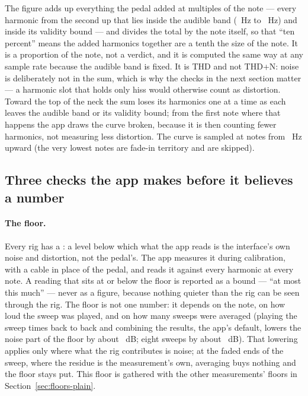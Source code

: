 \documentclass[11pt,a4paper]{article}
\begin{document}
The  figure adds up everything the pedal added at multiples of
the note --- every harmonic from the second up that lies inside the
audible band (\hdAudibleLowHz{}~Hz to \hdAudibleHighHz{}~Hz) and inside
its validity bound --- and divides the total by the note itself, so that
``ten percent'' means the added harmonics together are a tenth the size
of the note. It is a proportion of the note, not a verdict, and it is
computed the same way at any sample rate because the audible band is
fixed. It is THD and not THD+N: noise is deliberately not in the sum,
which is why the checks in the next section matter --- a harmonic slot
that holds only hiss would otherwise count as distortion. Toward the top
of the neck the sum loses its harmonics one at a time as each leaves the
audible band or its validity bound; from the first note where that
happens the app draws the curve broken, because it is then counting fewer
harmonics, not measuring less distortion. The curve is sampled at
\hdThdGridPoints{} notes from \hdThdGridLowHz{}~Hz upward (the very
lowest notes are fade-in territory and are skipped).

\subsection{Three checks the app makes before it believes a number}

\paragraph{The floor.} Every rig has a : a level below which
what the app reads is the interface's own noise and distortion, not the
pedal's. The app measures it during calibration, with a cable in place of
the pedal, and reads it against every harmonic at every note. A reading
that sits at or below the floor is reported as a bound --- ``at most this
much'' --- never as a figure, because nothing quieter than the rig can be
seen through the rig. The floor is not one number: it depends on the
note, on how loud the sweep was played, and on how many sweeps were
averaged (playing the sweep \hdDefaultAverages{} times back to back and
combining the results, the app's default, lowers the noise part of the
floor by about \hdAveragingFourDB{}~dB; eight sweeps by about
\hdAveragingEightDB{}~dB). That lowering applies only where what the rig
contributes is noise; at the faded ends of the sweep, where the residue
is the measurement's own, averaging buys nothing and the floor stays put.
This floor is gathered with the other measurements' floors in
Section~\ref{sec:floors-plain}.
\end{document}
